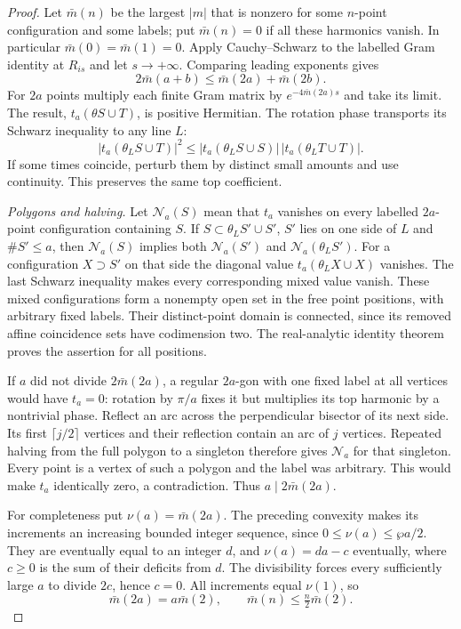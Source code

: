 \documentclass[11pt,letterpaper,reqno]{amsart}
\theoremstyle{definition}
\theoremstyle{remark}
\begin{document}
\begin{proof}
Let $\bar m(n)$ be the largest $|m|$ that is nonzero
for some $n$-point configuration and some labels;
put $\bar m(n)=0$ if all these harmonics vanish.
In particular $\bar m(0)=\bar m(1)=0$.
Apply Cauchy--Schwarz to the labelled Gram identity
at $R_{is}$ and let $s\to+\infty$.  Comparing leading
exponents gives
\[
 2\bar m(a+b)\le\bar m(2a)+\bar m(2b).
\]
For $2a$ points multiply each finite Gram matrix by
$e^{-4\bar m(2a)s}$ and take its limit.  The result,
$t_a(\theta S\cup T)$, is positive Hermitian.
The rotation phase transports its Schwarz inequality
to any line $L$:
\[
 |t_a(\theta_LS\cup T)|^2\le
 |t_a(\theta_LS\cup S)|\,
 |t_a(\theta_LT\cup T)|.
\]
If some times coincide, perturb them by distinct
small amounts and use continuity.  This preserves
the same top coefficient.

\emph{Polygons and halving.}
Let $\mathcal N_a(S)$ mean that $t_a$ vanishes on
every labelled $2a$-point configuration containing
$S$.  If $S\subset\theta_LS'\cup S'$, $S'$ lies
on one side of $L$ and $\#S'\le a$, then
$\mathcal N_a(S)$ implies both
$\mathcal N_a(S')$ and $\mathcal N_a(\theta_LS')$.
For a configuration $X\supset S'$ on that side the
diagonal value $t_a(\theta_LX\cup X)$ vanishes.
The last Schwarz inequality makes every corresponding
mixed value vanish.  These mixed configurations form
a nonempty open set in the free point positions,
with arbitrary fixed labels.  Their distinct-point
domain is connected, since its removed affine
coincidence sets have codimension two.  The
real-analytic identity theorem proves the assertion
for all positions.

If $a$ did not divide $2\bar m(2a)$, a regular
$2a$-gon with one fixed label at all vertices would
have $t_a=0$: rotation by $\pi/a$ fixes it but
multiplies its top harmonic by a nontrivial phase.
Reflect an arc across the perpendicular bisector of
its next side.  Its first $\lceil j/2\rceil$ vertices
and their reflection contain an arc of $j$ vertices.
Repeated halving from the full polygon to a singleton
therefore gives $\mathcal N_a$ for that singleton.
Every point is a vertex of such a polygon and the
label was arbitrary.  This would make $t_a$ identically
zero, a contradiction.  Thus $a\mid2\bar m(2a)$.

For completeness put $\nu(a)=\bar m(2a)$.
The preceding convexity makes its increments an
increasing bounded integer sequence, since
$0\le\nu(a)\le\wp a/2$.  They are eventually equal
to an integer $d$, and $\nu(a)=da-c$ eventually,
where $c\ge0$ is the sum of their deficits from $d$.
The divisibility forces every sufficiently large
$a$ to divide $2c$, hence $c=0$.  All increments
equal $\nu(1)$, so
\[
 \bar m(2a)=a\bar m(2),\qquad
                  \bar m(n)\le\tfrac n2\bar m(2).
\]


\end{proof}
\end{document}
